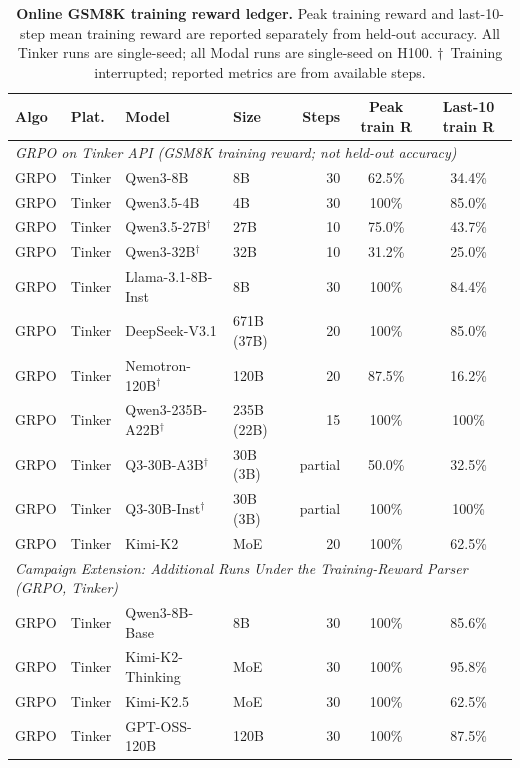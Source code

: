 \begin{table}[t]
\centering
\caption{\textbf{Online GSM8K training reward ledger.} Peak training reward and
last-10-step mean training reward are reported separately from held-out
accuracy. All Tinker runs are single-seed; all Modal runs are single-seed on
H100. $\dagger$~Training interrupted; reported metrics are from available
steps.}
\label{tab:main_results}
\scriptsize
\setlength{\tabcolsep}{3pt}
\begin{tabular}{@{}l l l l r c c@{}}
\toprule
\textbf{Algo} & \textbf{Plat.} & \textbf{Model} & \textbf{Size} & \textbf{Steps} & \textbf{Peak train R} & \textbf{Last-10 train R} \\
\midrule
\multicolumn{7}{l}{\textit{GRPO on Tinker API (GSM8K training reward; not held-out accuracy)}} \\
\midrule
GRPO & Tinker & Qwen3-8B & 8B & 30 & 62.5\% & 34.4\% \\
GRPO & Tinker & Qwen3.5-4B & 4B & 30 & 100\% & 85.0\% \\
GRPO & Tinker & Qwen3.5-27B$^\dagger$ & 27B & 10 & 75.0\% & 43.7\% \\
GRPO & Tinker & Qwen3-32B$^\dagger$ & 32B & 10 & 31.2\% & 25.0\% \\
GRPO & Tinker & Llama-3.1-8B-Inst & 8B & 30 & 100\% & 84.4\% \\
GRPO & Tinker & DeepSeek-V3.1 & 671B (37B) & 20 & 100\% & 85.0\% \\
GRPO & Tinker & Nemotron-120B$^\dagger$ & 120B & 20 & 87.5\% & 16.2\% \\
GRPO & Tinker & Qwen3-235B-A22B$^\dagger$ & 235B (22B) & 15 & 100\% & 100\% \\
GRPO & Tinker & Q3-30B-A3B$^\dagger$ & 30B (3B) & partial & 50.0\% & 32.5\% \\
GRPO & Tinker & Q3-30B-Inst$^\dagger$ & 30B (3B) & partial & 100\% & 100\% \\
GRPO & Tinker & Kimi-K2 & MoE & 20 & 100\% & 62.5\% \\
\midrule
\multicolumn{7}{l}{\textit{Campaign Extension: Additional Runs Under the Training-Reward Parser (GRPO, Tinker)}} \\
\midrule
GRPO & Tinker & Qwen3-8B-Base & 8B & 30 & 100\% & 85.6\% \\
GRPO & Tinker & Kimi-K2-Thinking & MoE & 30 & 100\% & 95.8\% \\
GRPO & Tinker & Kimi-K2.5 & MoE & 30 & 100\% & 62.5\% \\
GRPO & Tinker & GPT-OSS-120B & 120B & 30 & 100\% & 87.5\% \\

\end{tabular}
\end{table}
